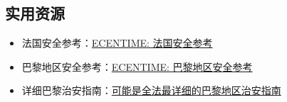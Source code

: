 \subsection{实用资源}

\begin{itemize}
    \item 法国安全参考：\href{https://www.ecentime.com/article/security-guide-in-france}{ECENTIME: 法国安全参考}
    \item 巴黎地区安全参考：\href{https://www.ecentime.com/article/securite-arrondissement}{ECENTIME: 巴黎地区安全参考}
    \item 详细巴黎治安指南：\href{https://mp.weixin.qq.com/s/EOGbefPAPmCXaiPJtq32Gw}{可能是全法最详细的巴黎地区治安指南}
\end{itemize}
